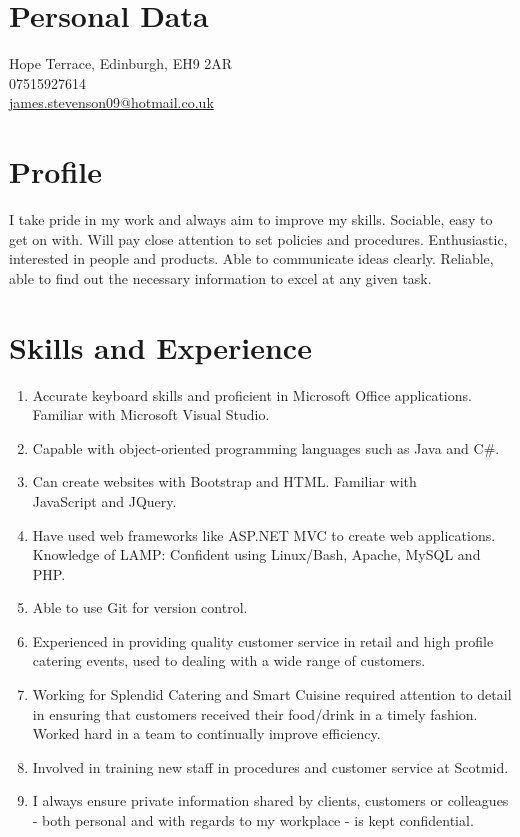 \documentclass[12pt, a4paper]{article}
\begin{document}
\par{\bigskip\par}

\section{Personal Data}

\large{} Hope Terrace, Edinburgh, EH9 2AR \\
07515927614\\
\href{mailto:james.stevenson09@hotmail.co.uk}{james.stevenson09@hotmail.co.uk}


\section{Profile}

\large{I take pride in my work and always aim to improve my skills.  
Sociable, easy to get on with.
Will pay close attention to set policies and procedures. 
Enthusiastic, interested in people and products. 
Able to communicate ideas clearly. 
Reliable, able to find out the necessary information to excel at any given task.}

\section{Skills and Experience}


\begin{enumerate}
	\item Accurate keyboard skills and proficient in Microsoft Office applications. Familiar with Microsoft Visual Studio.
	\item Capable with object-oriented programming languages such as Java and C\#. 
	\item Can create websites with Bootstrap and HTML. Familiar with \\JavaScript and JQuery.
	\item Have used web frameworks like ASP.NET MVC to create web applications. Knowledge of LAMP:  Confident using Linux/Bash, Apache, MySQL and PHP.
	\item Able to use Git for version control.
	\item Experienced in providing quality customer service in retail and high profile catering events, used to dealing with a wide range of customers.
	\item Working for Splendid Catering and Smart Cuisine required attention to detail in ensuring that customers received their food/drink in a timely fashion. Worked hard in a team to continually improve efficiency.
	\item Involved in training new staff in procedures and customer service at Scotmid.
	\item I always ensure private information shared by clients, customers or colleagues - both personal and with regards to my workplace - is kept confidential.
\end{enumerate}
\end{document}
